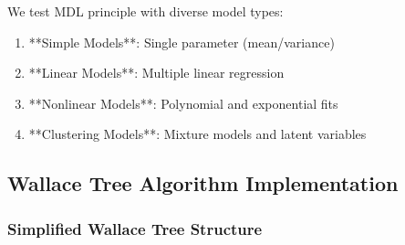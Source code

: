 We test MDL principle with diverse model types:

\begin{enumerate}
    \item **Simple Models**: Single parameter (mean/variance)
    \item **Linear Models**: Multiple linear regression
    \item **Nonlinear Models**: Polynomial and exponential fits
    \item **Clustering Models**: Mixture models and latent variables
\end{enumerate}

\subsection{Wallace Tree Algorithm Implementation}

\subsubsection{Simplified Wallace Tree Structure}

